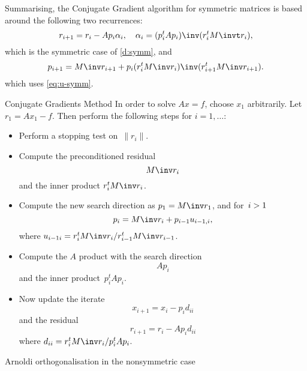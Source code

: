 \documentclass[11pt]{artikel3}
\begin{document}
\begin{Outline}
Summarising,
the Conjugate Gradient algorithm for symmetric matrices
is based around the following two recurrences:
\begin{equation}
    r_{i+1}=r_i-Ap_i\alpha_i,\quad \alpha_i=(p_i^tAp_i)\inv(r_i^tM\invt r_i),
    \label{eq:r-update}\end{equation}
which is the symmetric case of \eqref{d:symm}, and
\begin{equation}
    p_{i+1}=M\inv r_{i+1}+p_i(r_i^tM\inv r_i)\inv(r_{i+1}^tM\inv r_{i+1}).
    \label{eq:p-update}\end{equation}
which uses \eqref{eq:u-symm}.

\begin{algorithm}{Conjugate Gradients Method}
In order to solve $Ax=f$, choose $x_1$ arbitrarily.
Let $r_1=Ax_1-f$.
Then perform the following steps for $i=1,\ldots$:
\begin{itemize}
\item Perform a stopping test on~$\|r_i\|$.
\item Compute the preconditioned residual \[ M\inv r_i \]
and the inner product $r_i^tM\inv r_i$.
\item Compute the new search direction as $p_1=M\inv r_1$, 
and for~$i>\nobreak 1$
\[ p_i=M\inv r_i+p_{i-1}u_{i-1,i}, \]
where $u_{i-1i}=r_i^tM\inv r_i/r_{i-1}^tM\inv r_{i-1}$.
\item Compute the $A$ product with the search direction
\[ Ap_i \]
and the inner product~$p_i^tAp_i$.
\item Now update the iterate
\[ x_{i+1}=x_i-p_id_{ii} \]
and the residual
\[ r_{i+1}=r_i-Ap_id_{ii} \]
where $d_{ii}=r_i^tM\inv r_i/p_i^tAp_i$.
\end{itemize}
\end{algorithm}

 {Arnoldi orthogonalisation in the nonsymmetric case}
\label{sec:arnoldi-coeff-gen}


\end{Outline}
\end{document}
